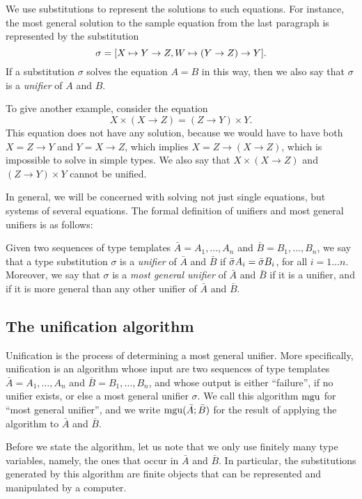 \documentclass{article}
\begin{document}
We use substitutions to represent the solutions to such equations. For
instance, the most general solution to the sample equation from the
last paragraph is represented by the substitution
\[ \sigma=[X\mapsto Y\to Z, W\mapsto (Y\to Z)\to Y].
\]
If a substitution $\sigma$ solves the equation $A=B$ in this way, then
we also say that $\sigma$ is a {\em unifier} of $A$ and $B$.

To give another example, consider the equation
\[ X\times(X\to Z) = (Z\to Y)\times Y.
\]
This equation does not have any solution, because we would have to
have both $X=Z\to Y$ and $Y=X\to Z$, which implies $X=Z\to(X\to Z)$,
which is impossible to solve in simple types. We also say that
$X\times(X\to Z)$ and $(Z\to Y)\times Y$ cannot be unified. 

In general, we will be concerned with solving not just single
equations, but systems of several equations. The formal definition of
unifiers and most general unifiers is as follows:

\begin{definition}
  Given two sequences of type templates $\bar{A}=A_1,\ldots,A_n$ and
  $\bar{B}=B_1,\ldots,B_n$, we say that a type substitution $\sigma$
  is a {\em unifier} of $\bar{A}$ and $\bar{B}$ if $\bar{\sigma}
  A_i=\bar{\sigma} B_i$, for all $i=1\ldots n$. Moreover, we say that
  $\sigma$ is a {\em most general unifier} of $\bar{A}$ and $\bar{B}$
  if it is a unifier, and if it is more general than any other
  unifier of $\bar{A}$ and $\bar{B}$.
\end{definition}

\subsection{The unification algorithm}

Unification is the process of determining a most general unifier. More
specifically, unification is an algorithm whose input are two
sequences of type templates $\bar{A}=A_1,\ldots,A_n$ and
$\bar{B}=B_1,\ldots,B_n$, and whose output is either ``failure'', if
no unifier exists, or else a most general unifier $\sigma$. We call
this algorithm $\mathop{\rm mgu}$ for ``most general unifier'', and we write
$\mathop{\rm mgu}(\bar{A};\bar{B})$ for the result of applying the algorithm to
$\bar{A}$ and $\bar{B}$. 

Before we state the algorithm, let us note that we only use finitely
many type variables, namely, the ones that occur in $\bar{A}$ and
$\bar{B}$. In particular, the substitutions generated by this
algorithm are finite objects that can be represented and manipulated
by a computer. 
\end{document}
